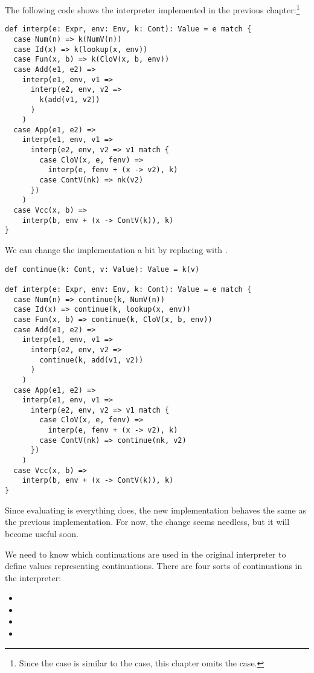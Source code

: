 The following code shows the \Lang interpreter implemented in the previous
chapter:\footnote{Since the  case is similar to the  case,
this chapter omits the  case.}

\begin{verbatim}
def interp(e: Expr, env: Env, k: Cont): Value = e match {
  case Num(n) => k(NumV(n))
  case Id(x) => k(lookup(x, env))
  case Fun(x, b) => k(CloV(x, b, env))
  case Add(e1, e2) =>
    interp(e1, env, v1 =>
      interp(e2, env, v2 =>
        k(add(v1, v2))
      )
    )
  case App(e1, e2) =>
    interp(e1, env, v1 =>
      interp(e2, env, v2 => v1 match {
        case CloV(x, e, fenv) =>
          interp(e, fenv + (x -> v2), k)
        case ContV(nk) => nk(v2)
      })
    )
  case Vcc(x, b) =>
    interp(b, env + (x -> ContV(k)), k)
}
\end{verbatim}

We can change the implementation a bit by replacing
 with .

\begin{verbatim}
def continue(k: Cont, v: Value): Value = k(v)

def interp(e: Expr, env: Env, k: Cont): Value = e match {
  case Num(n) => continue(k, NumV(n))
  case Id(x) => continue(k, lookup(x, env))
  case Fun(x, b) => continue(k, CloV(x, b, env))
  case Add(e1, e2) =>
    interp(e1, env, v1 =>
      interp(e2, env, v2 =>
        continue(k, add(v1, v2))
      )
    )
  case App(e1, e2) =>
    interp(e1, env, v1 =>
      interp(e2, env, v2 => v1 match {
        case CloV(x, e, fenv) =>
          interp(e, fenv + (x -> v2), k)
        case ContV(nk) => continue(nk, v2)
      })
    )
  case Vcc(x, b) =>
    interp(b, env + (x -> ContV(k)), k)
}
\end{verbatim}

Since evaluating  is everything  does, the new
implementation behaves the same as the previous implementation.
For now, the change seems needless, but it will become useful soon.

We need to know which continuations are used in the original interpreter to
define values representing continuations. There are four sorts of continuations
in the interpreter:

\begin{itemize}
  \item {}
  \item {}
  \item {}
  \item {}
\end{itemize}

